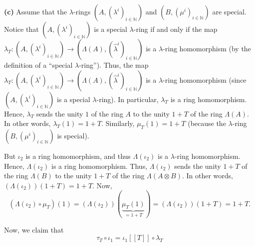 \documentclass[numbers=enddot,12pt,final,onecolumn,notitlepage]{scrartcl}%
\begin{document}
\textbf{(c)} Assume that the $\lambda$-rings $\left(  A,\left(  \lambda
^{i}\right)  _{i\in\mathbb{N}}\right)  $ and $\left(  B,\left(  \mu
^{i}\right)  _{i\in\mathbb{N}}\right)  $ are special. Notice that $\left(
A,\left(  \lambda^{i}\right)  _{i\in\mathbb{N}}\right)  $ is a special
$\lambda$-ring if and only if the map $\lambda_{T}:\left(  A,\left(
\lambda^{i}\right)  _{i\in\mathbb{N}}\right)  \rightarrow\left(
\Lambda\left(  A\right)  ,\left(  \widehat{\lambda}^{i}\right)  _{i\in
\mathbb{N}}\right)  $ is a $\lambda$-ring homomorphism (by the definition of a
\textquotedblleft special $\lambda$-ring\textquotedblright). Thus, the map
$\lambda_{T}:\left(  A,\left(  \lambda^{i}\right)  _{i\in\mathbb{N}}\right)
\rightarrow\left(  \Lambda\left(  A\right)  ,\left(  \widehat{\lambda}%
^{i}\right)  _{i\in\mathbb{N}}\right)  $ is a $\lambda$-ring homomorphism
(since $\left(  A,\left(  \lambda^{i}\right)  _{i\in\mathbb{N}}\right)  $ is a
special $\lambda$-ring). In particular, $\lambda_{T}$ is a ring homomorphism.
Hence, $\lambda_{T}$ sends the unity $1$ of the ring $A$ to the unity $1+T$ of
the ring $\Lambda\left(  A\right)  $. In other words, $\lambda_{T}\left(
1\right)  =1+T$. Similarly, $\mu_{T}\left(  1\right)  =1+T$ (because the
$\lambda$-ring $\left(  B,\left(  \mu^{i}\right)  _{i\in\mathbb{N}}\right)  $
is special).

But $\iota_{2}$ is a ring homomorphism, and thus $\Lambda\left(  \iota
_{2}\right)  $ is a $\lambda$-ring homomorphism. Hence, $\Lambda\left(
\iota_{2}\right)  $ is a ring homomorphism. Thus, $\Lambda\left(  \iota
_{2}\right)  $ sends the unity $1+T$ of the ring $\Lambda\left(  B\right)  $
to the unity $1+T$ of the ring $\Lambda\left(  A\otimes B\right)  $. In other
words, $\left(  \Lambda\left(  \iota_{2}\right)  \right)  \left(  1+T\right)
=1+T$. Now,%
\begin{equation}
\left(  \Lambda\left(  \iota_{2}\right)  \circ\mu_{T}\right)  \left(
1\right)  =\left(  \Lambda\left(  \iota_{2}\right)  \right)  \left(
\underbrace{\mu_{T}\left(  1\right)  }_{=1+T}\right)  =\left(  \Lambda\left(
\iota_{2}\right)  \right)  \left(  1+T\right)  =1+T. \label{sol.6.11.c.1}%
\end{equation}


Now, we claim that%
\begin{equation}
\tau_{T}\circ\iota_{1}=\iota_{1}\left[  \left[  T\right]  \right]
\circ\lambda_{T} \label{sol.6.11.c.cl1}%
\end{equation}
\end{document}
